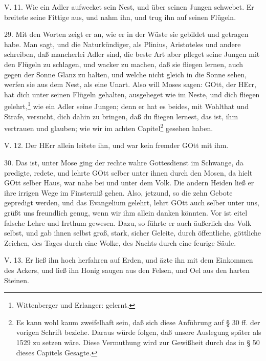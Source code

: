 \begin{schriftzitat}
V. 11. Wie ein Adler aufwecket sein Nest, und über seinen Jungen schwebet. Er breitete seine Fittige aus, und nahm ihn, und trug ihn auf seinen Flügeln.
\end{schriftzitat}

29. Mit den Worten zeigt er an, wie er in der Wüste sie gebildet und getragen habe. Man sagt, und die Naturkündiger, als Plinius, Aristoteles und andere schreiben, daß mancherlei Adler sind, die beste Art aber pfleget seine Jungen mit den Flügeln zu schlagen, und wacker zu machen, daß sie fliegen lernen, auch gegen der Sonne Glanz zu halten, und welche nicht gleich in die Sonne sehen, werfen sie aus dem Nest, als eine Unart. Also will Moses sagen: GOtt, der HErr, hat dich unter seinen Flügeln gehalten, ausgeheget wie im Neste, und dich fliegen gelehrt,\footnote{Wittenberger und Erlanger: gelernt.} wie ein Adler seine Jungen; denn er hat es beides, mit Wohlthat und Strafe, versucht, dich dahin zu bringen, daß du fliegen lernest, das ist, ihm vertrauen und glauben; wie wir im achten Capitel\footnote{Es kann wohl kaum zweifelhaft sein, daß sich diese Anführung auf § 30 ff. der vorigen Schrift beziehe. Daraus würde folgen, daß unsere Auslegung später als 1529 zu setzen wäre. Diese Vermuthung wird zur Gewißheit durch das in § 50 dieses Capitels Gesagte.} gesehen haben.

\begin{schriftzitat}
V. 12. Der HErr allein leitete ihn, und war kein fremder GOtt mit ihm.
\end{schriftzitat}

30. Das ist, unter Mose ging der rechte wahre Gottesdienst im Schwange, da predigte, redete, und lehrte GOtt selber unter ihnen durch den Mosen, da hielt GOtt selber Haus, war nahe bei und unter dem Volk. Die andern Heiden ließ er ihre irrigen Wege im Finsterniß gehen. Also, jetzund, so die zehn Gebote gepredigt werden, und das Evangelium gelehrt, lehrt GOtt auch selber unter uns, grüßt uns freundlich genug, wenn wir ihm allein danken könnten. Vor ist eitel falsche Lehre und Irrthum gewesen. Dazu, so führte er auch äußerlich das Volk selbst, und gab ihnen selbst groß, stark, sicher Geleite, durch öffentliche, göttliche Zeichen, des Tages durch eine Wolke, des Nachts durch eine feurige Säule.

\begin{schriftzitat}
V. 13. Er ließ ihn hoch herfahren auf Erden, und äzte ihn mit dem Einkommen des Ackers, und ließ ihn Honig saugen aus den Felsen, und Oel aus den harten Steinen.
\end{schriftzitat}

